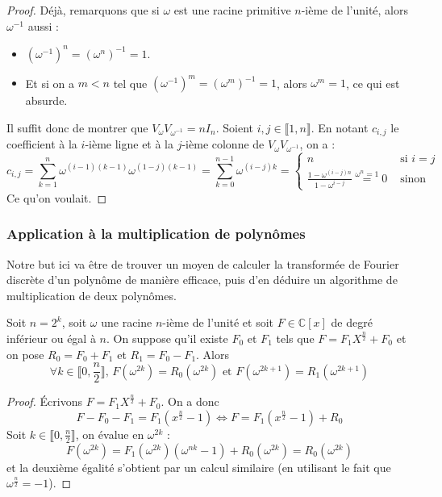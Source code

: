 	\begin{proof}
		Déjà, remarquons que si $\omega$ est une racine primitive $n$-ième de l'unité, alors $\omega^{-1}$ aussi :
		\begin{itemize}
			\item $(\omega^{-1})^n = (\omega^n)^{-1} = 1$.
			\item Et si on a $m < n$ tel que $(\omega^{-1})^m = (\omega^m)^{-1} = 1$, alors $\omega^m = 1$, ce qui est absurde.
		\end{itemize}
		Il suffit donc de montrer que $V_\omega V_{\omega^{-1}} = n I_n$. Soient $i, j \in \llbracket 1, n \rrbracket$. En notant $c_{i,j}$ le coefficient à la $i$-ième ligne et à la $j$-ième colonne de $V_\omega V_{\omega^{-1}}$, on a :
		\[
		c_{i,j}
		= \sum_{k=1}^n \omega^{(i-1)(k-1)} \omega^{(1-j)(k-1)}
		= \sum_{k=0}^{n-1} \omega^{(i-j)k}
		= \begin{cases}
			n &\text{ si } i = j \\
			\frac{1 - \omega^{(i-j)n}}{1 - \omega^{i-j}} \overset{\omega^n = 1}{=} 0 &\text{ sinon}
		\end{cases}
		\]
		Ce qu'on voulait.
	\end{proof}
	
	\subsubsection{Application à la multiplication de polynômes}
	
	Notre but ici va être de trouver un moyen de calculer la transformée de Fourier discrète d'un polynôme de manière efficace, puis d'en déduire un algorithme de multiplication de deux polynômes.
	
	\begin{proposition}
		\label{transformee-de-fourier-discrete-4}
		Soit $n = 2^k$, soit $\omega$ une racine $n$-ième de l'unité et soit $F \in \mathbb{C}[x]$ de degré inférieur ou égal à $n$. On suppose qu'il existe $F_0$ et $F_1$ tels que $F = F_1 X^{\frac{n}{2}} + F_0$ et on pose $R_0 = F_0 + F_1$ et $R_1 = F_0 - F_1$. Alors
		\[ \forall k \in \llbracket 0, \frac{n}{2} \rrbracket, \, F(\omega^{2k}) = R_0(\omega^{2k}) \text{ et } F(\omega^{2k+1}) = R_1(\omega^{2k+1}) \]
	\end{proposition}
	
	\begin{proof}
		Écrivons $F = F_1 X^{\frac{n}{2}} + F_0$. On a donc
		\[ F - F_0 - F_1 = F_1(x^{\frac{n}{2}} - 1) \iff F = F_1(x^{\frac{n}{2}} - 1) + R_0 \]
		Soit $ k \in \llbracket 0, \frac{n}{2} \rrbracket$, on évalue en $\omega^{2k}$ :
		\[ F(\omega^{2k}) = F_1(\omega^{2k})(\omega^{nk} - 1) + R_0(\omega^{2k}) = R_0(\omega^{2k}) \]
		et la deuxième égalité s'obtient par un calcul similaire (en utilisant le fait que $\omega^{\frac{n}{2}} = -1$).
	\end{proof}
	

